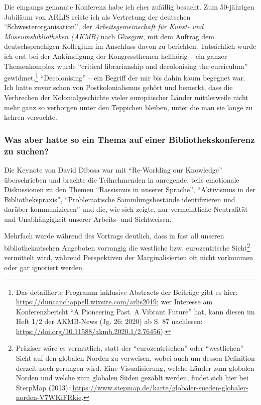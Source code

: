 \documentclass[a4paper,
fontsize=11pt,
oneside,
numbers=noperiodatend,
parskip=half-,
bibliography=totoc,
final
]{scrartcl}
\begin{document}
Die eingangs genannte Konferenz habe ich eher zufällig besucht. Zum
50-jährigen Jubiläum von ARLIS reiste ich als Vertretung der deutschen
\enquote{Schwesterorganisation}, der \emph{Arbeitsgemeinschaft für
Kunst- und Museumsbibliotheken (AKMB)} nach Glasgow, mit dem Auftrag dem
deutschsprachigen Kollegium im Anschluss davon zu berichten. Tatsächlich
wurde ich erst bei der Ankündigung der Kongressthemen hellhörig -- ein
ganzer Themenkomplex wurde \enquote{critical librarianship and
decolonising the curriculum} gewidmet.\footnote{Das detaillierte
  Programm inklusive Abstracts der Beiträge gibt es hier:
  \url{https://duncanchappell.wixsite.com/arlis2019}; wer Interesse am
  Konferenzbericht \enquote{A Pioneering Past. A Vibrant Future} hat,
  kann diesen im Heft 1/2 der AKMB-News (Jg. 26; 2020) ab S. 87
  nachlesen: \url{https://doi.org/10.11588/akmb.2020.1/2.76456)}.}
\enquote{Decolonising} -- ein Begriff der mir bis dahin kaum begegnet
war. Ich hatte zuvor schon von Postkolonialismus gehört und bemerkt,
dass die Verbrechen der Kolonialgeschichte vieler europäischer Länder
mittlerweile nicht mehr ganz so verborgen unter den Teppichen bleiben,
unter die man sie lange zu kehren versuchte.

\hypertarget{was-aber-hatte-so-ein-thema-auf-einer-bibliothekskonferenz-zu-suchen}{%
\subsubsection{Was aber hatte so ein Thema auf einer
Bibliothekskonferenz zu
suchen?}\label{was-aber-hatte-so-ein-thema-auf-einer-bibliothekskonferenz-zu-suchen}}

Die Keynote von David Dibosa war mit \enquote{Re-Worlding our Knowledge}
überschrieben und brachte die Teilnehmenden in anregende, teils
emotionale Diskussionen zu den Themen \enquote{Rassismus in unserer
Sprache}, \enquote{Aktivismus in der Bibliothekspraxis},
\enquote{Problematische Sammlungsbestände identifizieren und darüber
kommunizieren} und die, wie sich zeigte, nur vermeintliche Neutralität
und Unabhängigkeit unserer Arbeits- und Sichtweisen.

Mehrfach wurde während des Vortrags deutlich, dass in fast all unseren
bibliothekarischen Angeboten vorrangig die westliche bzw. eurozentrische
Sicht\footnote{Präziser wäre es vermutlich, statt der
  \enquote{eurozentrischen} oder \enquote{westlichen} Sicht auf den
  globalen Norden zu verweisen, wobei auch um dessen Definition derzeit
  noch gerungen wird. Eine Visualisierung, welche Länder zum globalen
  Norden und welche zum globalen Süden gezählt werden, findet sich hier
  bei SterpMap (2013):
  \url{https://www.stepmap.de/karte/globaler-sueden-globaler-norden-V7WKiFRkie}.}
vermittelt wird, während Perspektiven der Marginalisierten oft nicht
vorkommen oder gar ignoriert werden.
\end{document}
